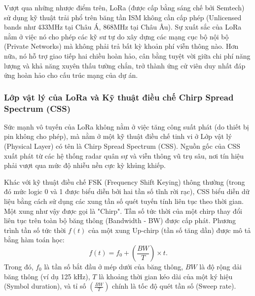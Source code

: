 Vượt qua những nhược điểm trên, LoRa (được cấp bằng sáng chế bởi Semtech) sử dụng kỹ thuật trải phổ trên băng tần ISM không cần cấp phép (Unlicensed bands như 433MHz tại Châu Á, 868MHz tại Châu Âu). Sự xuất sắc của LoRa nằm ở việc nó cho phép các kỹ sư tự do xây dựng các mạng cục bộ nội bộ (Private Networks) mà không phải trả bất kỳ khoản phí viễn thông nào. Hơn nữa, nó hỗ trợ giao tiếp hai chiều hoàn hảo, cân bằng tuyệt vời giữa chi phí năng lượng và khả năng xuyên thấu tường chắn, trở thành ứng cử viên duy nhất đáp ứng hoàn hảo cho cấu trúc mạng của dự án.

\subsubsection{Lớp vật lý của LoRa và Kỹ thuật điều chế Chirp Spread Spectrum (CSS) \cite{augustin2016study}}
Sức mạnh vô tuyến của LoRa không nằm ở việc tăng công suất phát (do thiết bị pin không cho phép), mà nằm ở một kỹ thuật điều chế tinh vi ở Lớp vật lý (Physical Layer) có tên là Chirp Spread Spectrum (CSS). Nguồn gốc của CSS xuất phát từ các hệ thống radar quân sự và viễn thông vũ trụ sâu, nơi tín hiệu phải vượt qua mức độ nhiễu nền cực kỳ khủng khiếp.

Khác với kỹ thuật điều chế FSK (Frequency Shift Keying) thông thường (trong đó mức logic 0 và 1 được biểu diễn bởi hai tần số tĩnh rời rạc), CSS biểu diễn dữ liệu bằng cách sử dụng các xung tần số quét tuyến tính liên tục theo thời gian. Một xung như vậy được gọi là "Chirp". Tần số tức thời của một chirp thay đổi liên tục trên toàn bộ băng thông (Bandwidth - BW) được cấp phát. Phương trình tần số tức thời $f(t)$ của một xung Up-chirp (tần số tăng dần) được mô tả bằng hàm toán học\cite{vangelista2015frequency}:
\begin{equation}
    {f(t) = f_0 + \left( \frac{BW}{T} \right) \times t}.
\end{equation}
Trong đó, $f_0$ là tần số bắt đầu ở mép dưới của băng thông, $BW$ là độ rộng dải băng thông (ví dụ 125 kHz), $T$ là khoảng thời gian kéo dài của một ký hiệu (Symbol duration), và tỉ số $\left( \frac{BW}{T} \right)$ chính là tốc độ quét tần số (Sweep rate).

